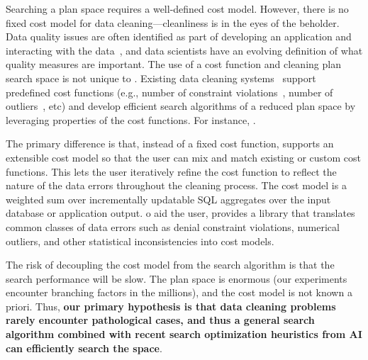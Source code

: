 
Searching a plan space requires a well-defined cost model.  However, there is no fixed cost model for data cleaning---cleanliness is in the eyes of the beholder. Data quality issues are often identified as part of developing an application and interacting with the data~\cite{krishnan2016hilda}, and data scientists have an evolving definition of what quality measures are important.  The use of a cost function and cleaning plan search space is not unique to \sys.  Existing data cleaning systems~\cite{} support predefined cost functions (e.g., number of constraint violations~\cite{}, number of outliers~\cite{}, etc) and develop efficient search algorithms of a reduced plan space by leveraging properties of the cost functions.  For instance, .  

The primary difference is that, instead of a fixed cost function, \sys supports an extensible cost model so that the user can mix and match existing or custom cost functions.  This lets the user iteratively refine the cost function to reflect the nature of the data errors throughout the cleaning process.  The cost model is a weighted sum over incrementally updatable SQL aggregates over the input database or application output.  o aid the user,  \sys provides a library that translates common classes of data errors such as denial constraint violations, numerical outliers, and other statistical inconsistencies into cost models.

The risk of decoupling the cost model from the search algorithm is that the search performance will be slow.  The plan space is enormous (our experiments encounter branching factors in the millions), and the cost model is not known a priori.  Thus, \textbf{our primary hypothesis is that data cleaning problems rarely encounter pathological cases, and thus a general search algorithm combined with recent search optimization heuristics from AI can efficiently search the space}.

